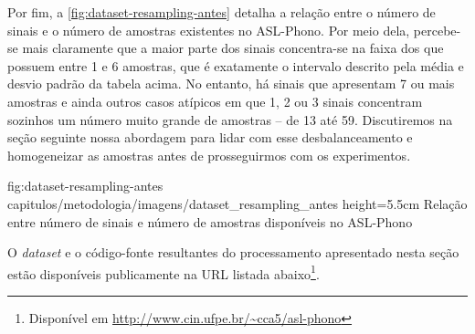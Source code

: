 Por fim, a \autoref{fig:dataset-resampling-antes} detalha a relação entre o número de sinais e o número de amostras existentes no ASL-Phono. Por meio dela, percebe-se mais claramente que a maior parte dos sinais concentra-se na faixa dos que possuem entre 1 e 6 amostras, que é exatamente o intervalo descrito pela média e desvio padrão da tabela acima.
No entanto, há sinais que apresentam 7 ou mais amostras e ainda outros casos atípicos em que 1, 2 ou 3 sinais concentram sozinhos um número muito grande de amostras -- de 13 até 59.
Discutiremos na seção seguinte nossa abordagem para lidar com esse desbalanceamento e homogeneizar as amostras antes de prosseguirmos com os experimentos.

\figura
{fig:dataset-resampling-antes} %
{capitulos/metodologia/imagens/dataset_resampling_antes} %
{height=5.5cm} %
{Relação entre número de sinais e número de amostras disponíveis no ASL-Phono} %
{} %


O \textit{dataset} e o código-fonte resultantes do processamento apresentado nesta seção estão disponíveis publicamente na URL listada abaixo\footnote{Disponível em \url{http://www.cin.ufpe.br/~cca5/asl-phono}}.

